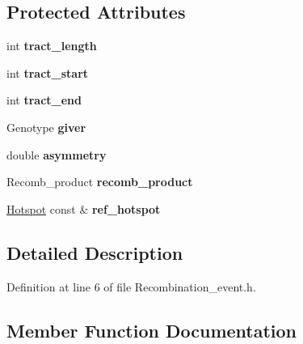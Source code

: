 \subsection*{Protected Attributes}
\begin{DoxyCompactItemize}
\item 
\mbox{\label{class_recombination__event_a723302f94878b2cd9e36e61673dc0207}} 
int {\bfseries tract\+\_\+length}
\item 
\mbox{\label{class_recombination__event_a91c1a7cb85b376da03e5b26c765d3fde}} 
int {\bfseries tract\+\_\+start}
\item 
\mbox{\label{class_recombination__event_a7161ea1c6f31a9b50247fb04f0794351}} 
int {\bfseries tract\+\_\+end}
\item 
\mbox{\label{class_recombination__event_a8f4442588abc4bfbdf9524d1cb075cd5}} 
Genotype {\bfseries giver}
\item 
\mbox{\label{class_recombination__event_afc62b2f310e75ab9d7c561b10f0a0297}} 
double {\bfseries asymmetry}
\item 
\mbox{\label{class_recombination__event_a563f07a81f811614975efb68bea17ada}} 
Recomb\+\_\+product {\bfseries recomb\+\_\+product}
\item 
\mbox{\label{class_recombination__event_a05e18a50a6c816a6b7677416c4f2f67d}} 
\mbox{\hyperlink{class_hotspot}{Hotspot}} const  \& {\bfseries ref\+\_\+hotspot}
\end{DoxyCompactItemize}


\subsection{Detailed Description}


Definition at line 6 of file Recombination\+\_\+event.\+h.



\subsection{Member Function Documentation}
\mbox{\label{class_recombination__event_a452bf9940c36aaf1063ffc62a06b055f}} 
